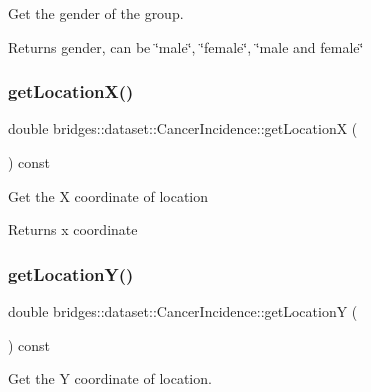 Get the gender of the group. 

\begin{DoxyReturn}{Returns}
gender, can be \char`\"{}male\char`\"{}, \char`\"{}female\char`\"{}, \char`\"{}male and female\char`\"{} 
\end{DoxyReturn}
\mbox{\label{classbridges_1_1dataset_1_1_cancer_incidence_a982dc26b86ddeddf57d284b78dfd0752}} 
\subsubsection{\texorpdfstring{get\+Location\+X()}{getLocationX()}}
{\footnotesize\ttfamily double bridges\+::dataset\+::\+Cancer\+Incidence\+::get\+LocationX (\begin{DoxyParamCaption}{ }\end{DoxyParamCaption}) const\hspace{0.3cm}{\ttfamily [inline]}}

Get the X coordinate of location

\begin{DoxyReturn}{Returns}
x coordinate 
\end{DoxyReturn}
\mbox{\label{classbridges_1_1dataset_1_1_cancer_incidence_af962caa4876c628cae5beaca9780650e}} 
\subsubsection{\texorpdfstring{get\+Location\+Y()}{getLocationY()}}
{\footnotesize\ttfamily double bridges\+::dataset\+::\+Cancer\+Incidence\+::get\+LocationY (\begin{DoxyParamCaption}{ }\end{DoxyParamCaption}) const\hspace{0.3cm}{\ttfamily [inline]}}



Get the Y coordinate of location. 

